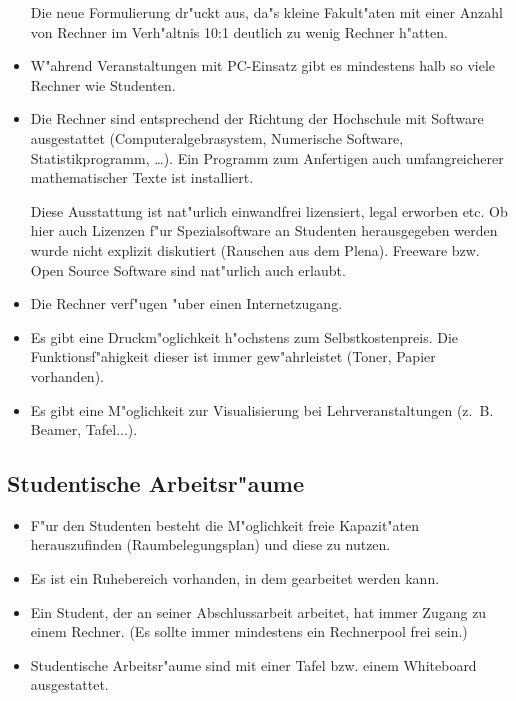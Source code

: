 \begin{itemize}
\begin{kcmt}
\begin{komacmt}
	Die neue Formulierung dr"uckt aus, da"s kleine Fakult"aten mit einer Anzahl von
	Rechner im Verh"altnis 10:1 deutlich zu wenig Rechner h"atten.
\end{komacmt}\end{kcmt}
	\item W"ahrend Veranstaltungen mit PC-Einsatz gibt es mindestens halb so viele Rechner wie Studenten.
	\item Die Rechner sind entsprechend der Richtung der Hochschule mit Software 
		ausgestattet (Computeralgebrasystem, Numerische Software, Statistikprogramm, \dots). 
		Ein Programm zum Anfertigen auch umfangreicherer mathematischer Texte ist installiert.
\begin{kcmt}\begin{komacmt}
	Diese Ausstattung ist nat"urlich einwandfrei lizensiert, legal erworben etc.
	Ob hier auch Lizenzen f"ur Spezialsoftware an Studenten herausgegeben werden
	wurde nicht explizit diskutiert (Rauschen aus dem Plena).
	Freeware bzw. Open Source Software sind nat"urlich auch erlaubt.
\end{komacmt}\end{kcmt}
	\item Die Rechner verf"ugen "uber einen Internetzugang. 
	\item Es gibt eine Druckm"oglichkeit h"ochstens zum Selbstkostenpreis. 
		Die Funktionsf"ahigkeit dieser ist immer gew"ahrleistet (Toner, Papier vorhanden).
	\item Es gibt eine M"oglichkeit zur Visualisierung bei Lehrveranstaltungen (z.~B. Beamer, Tafel...).
\end{itemize}

\subsection{Studentische Arbeitsr"aume}
\begin{itemize}
	\item F"ur den Studenten besteht die M"oglichkeit freie Kapazit"aten herauszufinden 
		(Raumbelegungsplan) und diese zu nutzen. 
	\item Es ist ein Ruhebereich vorhanden, in dem gearbeitet werden kann.
	\item Ein Student, der an seiner Abschlussarbeit arbeitet, hat immer Zugang zu einem Rechner. 
		(Es sollte immer mindestens ein Rechnerpool frei sein.)
	\item Studentische Arbeitsr"aume sind mit einer Tafel bzw. einem Whiteboard ausgestattet.
\end{itemize}


